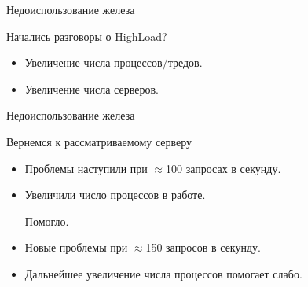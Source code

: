 \documentclass[aspectratio=169]{beamer}
\begin{document}
\begin{frame}{Недоиспользование железа}
    \begin{block}{Начались разговоры о HighLoad?}
        \begin{itemize}
            \pause
            \item Увеличение числа процессов/тредов.
            
            \pause
            \item Увеличение числа серверов.
        \end{itemize}
    \end{block}
\end{frame}

\begin{frame}{Недоиспользование железа}
    \begin{block}{Вернемся к рассматриваемому серверу}
        \begin{itemize}
            \pause\item Проблемы наступили при $\approx$100 запросах в секунду.
            
            \pause\item Увеличили число процессов в работе.
                \pause\par Помогло.

            \pause\item Новые проблемы при $\approx$150 запросов в секунду.
            
            \pause\item Дальнейшее увеличение числа процессов помогает слабо.
        \end{itemize}
    \end{block}
\end{frame}
\end{document}
